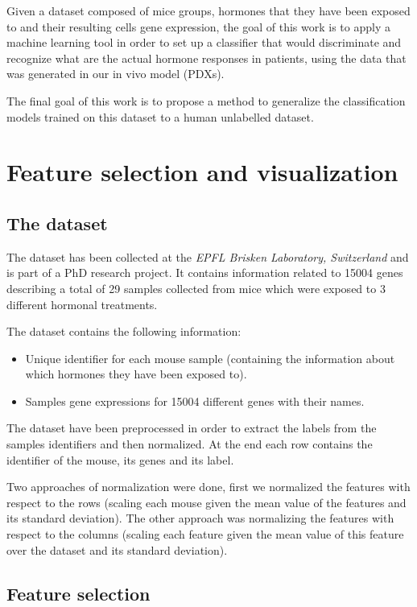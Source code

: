 \documentclass[10pt,conference,compsocconf]{IEEEtran}
\begin{document}
Given a dataset composed of mice groups, hormones that they have been exposed to and their resulting cells gene expression, the goal of this work is to apply a machine learning tool in order to set up a classifier that would discriminate and recognize what are the actual hormone responses in patients, using the data that was generated in our in vivo model (PDXs).

The final goal of this work is to propose a method to generalize the classification models trained on this dataset to a human unlabelled dataset.

\section{Feature selection and visualization}

\subsection{The dataset}

The dataset has been collected at the \emph{EPFL Brisken Laboratory, Switzerland} and is part of a PhD research project. It contains information related to 15004 genes describing a total of 29 samples collected from mice which were exposed to 3 different hormonal treatments.

The dataset contains the following information:
\begin{itemize}
    \item Unique identifier for each mouse sample (containing the information about which hormones they have been exposed to).
    \item Samples gene expressions for 15004 different genes with their names.
\end{itemize}

The dataset have been preprocessed in order to extract the labels from the samples identifiers and then normalized. At the end each row contains the identifier of the mouse, its genes and its label.

Two approaches of normalization were done, first we normalized the features with respect to the rows (scaling each mouse given the mean value of the features and its standard deviation). The other approach was normalizing the features with respect to the columns (scaling each feature given the mean value of this feature over the dataset and its standard deviation).

\subsection{Feature selection}
\end{document}
